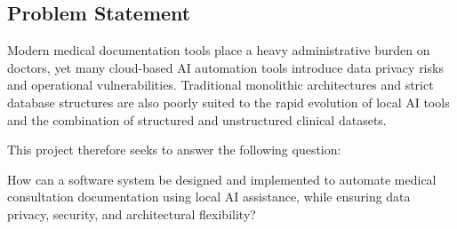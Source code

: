 \subsection{Problem Statement}
\label{subsec:problem-statement}

Modern medical documentation tools place a heavy administrative burden on doctors, yet many cloud-based AI automation tools introduce data privacy risks and operational vulnerabilities. Traditional monolithic architectures and strict database structures are also poorly suited to the rapid evolution of local AI tools and the combination of structured and unstructured clinical datasets.

This project therefore seeks to answer the following question:

\begin{summarybox}
How can a software system be designed and implemented to automate medical consultation documentation using local AI assistance, while ensuring data privacy, security, and architectural flexibility?
\end{summarybox}